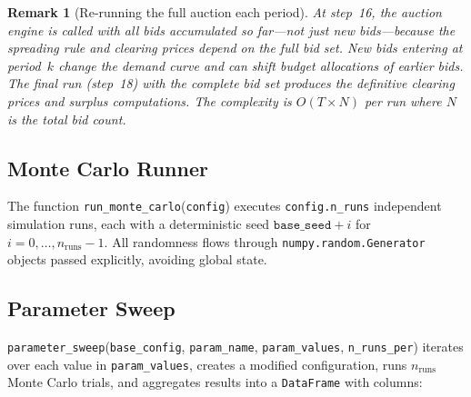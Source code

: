 \documentclass[11pt,a4paper]{article}
\newtheorem{remark}{Remark}
\begin{document}
\begin{remark}[Re-running the full auction each period]
At step~16, the auction engine is called with \emph{all} bids accumulated so far—not just new bids—because the spreading rule and clearing prices depend on the full bid set.  New bids entering at period~$k$ change the demand curve and can shift budget allocations of earlier bids.  The final run (step~18) with the complete bid set produces the definitive clearing prices and surplus computations.  The complexity is $O(T \times N)$ per run where $N$ is the total bid count.
\end{remark}

\subsection{Monte Carlo Runner}
\label{sec:monte-carlo}

The function \texttt{run\_monte\_carlo}(\texttt{config}) executes \texttt{config.n\_runs} independent simulation runs, each with a deterministic seed $\texttt{base\_seed} + i$ for $i = 0,\dots,n_{\text{runs}}-1$.  All randomness flows through \texttt{numpy.random.Generator} objects passed explicitly, avoiding global state.

\subsection{Parameter Sweep}
\label{sec:sweep}

\texttt{parameter\_sweep}(\texttt{base\_config}, \texttt{param\_name}, \texttt{param\_values}, \texttt{n\_runs\_per}) iterates over each value in \texttt{param\_values}, creates a modified configuration, runs $n_{\text{runs}}$ Monte Carlo trials, and aggregates results into a \texttt{DataFrame} with columns:
\end{document}
